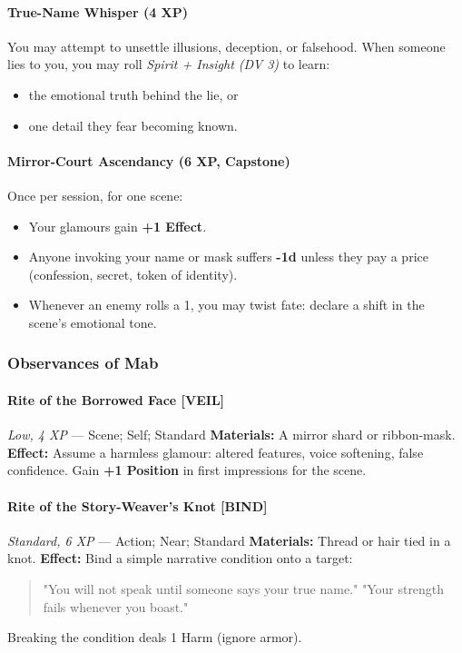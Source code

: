\documentclass[11pt]{book}
\begin{document}
\paragraph{True-Name Whisper (4 XP)}
You may attempt to unsettle illusions, deception, or falsehood.  
When someone lies to you, you may roll \emph{Spirit + Insight (DV 3)} to learn:
\begin{itemize}[leftmargin=*]
    \item the emotional truth behind the lie, or  
    \item one detail they fear becoming known.
\end{itemize}

\paragraph{Mirror-Court Ascendancy (6 XP, Capstone)}
Once per session, for one scene:
\begin{itemize}[leftmargin=*]
    \item Your glamours gain \textbf{+1 Effect}.  
    \item Anyone invoking your name or mask suffers \textbf{-1d} unless they pay a price (confession, secret, token of identity).  
    \item Whenever an enemy rolls a 1, you may twist fate: declare a shift in the scene's emotional tone.
\end{itemize}

\subsubsection{Observances of Mab}

\paragraph{Rite of the Borrowed Face [VEIL]}
\emph{Low, 4 XP} --- Scene; Self; Standard  
\textbf{Materials:} A mirror shard or ribbon-mask.  
\textbf{Effect:} Assume a harmless glamour: altered features, voice softening, false confidence.  
Gain \textbf{+1 Position} in first impressions for the scene.

\paragraph{Rite of the Story-Weaver's Knot [BIND]}
\emph{Standard, 6 XP} --- Action; Near; Standard  
\textbf{Materials:} Thread or hair tied in a knot.  
\textbf{Effect:} Bind a simple narrative condition onto a target:
\begin{quote}
    "You will not speak until someone says your true name."  
    "Your strength fails whenever you boast."
\end{quote}
Breaking the condition deals 1 Harm (ignore armor).
\end{document}
